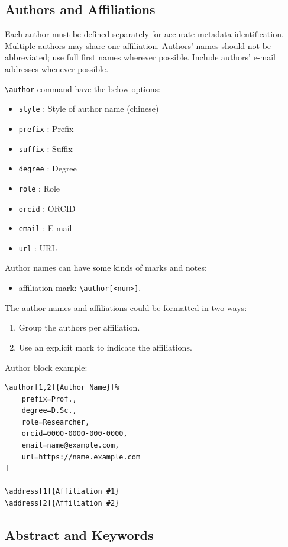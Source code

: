\documentclass[
]{ceurart}
\begin{document}
\subsection{Authors and Affiliations}

Each author must be defined separately for accurate metadata
identification. Multiple authors may share one affiliation. Authors'
names should not be abbreviated; use full first names wherever
possible. Include authors' e-mail addresses whenever possible.

\verb|\author| command have the below options: 

\begin{itemize}
\item \verb|style| : Style of author name (chinese)
\item \verb|prefix| : Prefix
\item \verb|suffix| : Suffix
\item \verb|degree| : Degree
\item \verb|role| : Role
\item \verb|orcid| : ORCID
\item \verb|email| : E-mail
\item \verb|url| : URL
\end{itemize}

Author names can have some kinds of marks and notes:
\begin{itemize}
\item affiliation mark: \verb|\author[<num>]|.
\end{itemize}

The author names and affiliations could be formatted in two ways:
\begin{enumerate}
\item Group the authors per affiliation.
\item Use an explicit mark to indicate the affiliations.
\end{enumerate}

Author block example:
\begin{lstlisting}
\author[1,2]{Author Name}[%
    prefix=Prof.,
    degree=D.Sc.,
    role=Researcher,
    orcid=0000-0000-000-0000,
    email=name@example.com,
    url=https://name.example.com
]

\address[1]{Affiliation #1}
\address[2]{Affiliation #2}
\end{lstlisting}

\subsection{Abstract and Keywords}
\end{document}
